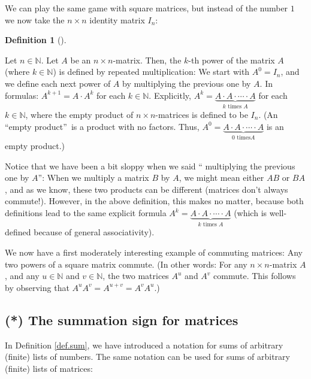 \documentclass[numbers=enddot,12pt,final,onecolumn,notitlepage]{scrartcl}%
\theoremstyle{definition}
\newtheorem{defi}[theo]{Definition}
\newenvironment{definition}[1][]
{\begin{defi}[#1]\begin{leftbar}}
{\end{leftbar}\end{defi}}
\begin{document}
We can play the same game with square matrices, but instead of the number $1$
we now take the $n\times n$ identity matrix $I_{n}$:

\begin{definition}
Let $n\in\mathbb{N}$. Let $A$ be an $n\times n$-matrix. Then, the $k$-th power
of the matrix $A$ (where $k\in\mathbb{N}$) is defined by repeated
multiplication: We start with $A^{0}=I_{n}$, and we define each next power of
$A$ by multiplying the previous one by $A$. In formulas: $A^{k+1}=A\cdot
A^{k}$ for each $k\in\mathbb{N}$. Explicitly, $A^{k}=\underbrace{A\cdot
A\cdot\cdots\cdot A}_{k\text{ times }A}$ for each $k\in\mathbb{N}$, where the
empty product of $n\times n$-matrices is defined to be $I_{n}$. (An
\textquotedblleft empty product\textquotedblright\ is a product with no
factors. Thus, $A^{0}=\underbrace{A\cdot A\cdot\cdots\cdot A}_{0\text{ times
}A}$ is an empty product.)
\end{definition}

Notice that we have been a bit sloppy when we said \textquotedblleft
multiplying the previous one by $A$\textquotedblright: When we multiply a
matrix $B$ by $A$, we might mean either $AB$ or $BA$, and as we know, these
two products can be different (matrices don't always commute!). However, in
the above definition, this makes no matter, because both definitions lead to
the same explicit formula $A^{k}=\underbrace{A\cdot A\cdot\cdots\cdot
A}_{k\text{ times }A}$ (which is well-defined because of general associativity).

We now have a first moderately interesting example of commuting matrices: Any
two powers of a square matrix commute. (In other words: For any $n\times
n$-matrix $A$, and any $u\in\mathbb{N}$ and $v\in\mathbb{N}$, the two matrices
$A^{u}$ and $A^{v}$ commute. This follows by observing that $A^{u}%
A^{v}=A^{u+v}=A^{v}A^{u}$.)

\subsection{\label{sect.intro.sum-matrices}(*) The summation sign for
matrices}

In Definition \ref{def.sum}, we have introduced a notation for sums of
arbitrary (finite) lists of numbers. The same notation can be used for sums of
arbitrary (finite) lists of matrices:
\end{document}
